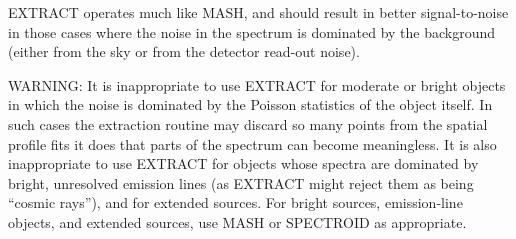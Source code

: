 EXTRACT operates much like MASH, and should result in better
signal-to-noise in those cases where the noise in the spectrum is dominated
by the background (either from the sky or from the detector read-out
noise).  

WARNING: It is inappropriate to use EXTRACT for moderate or bright objects
in which the noise is dominated by the Poisson statistics of the object
itself.  In such cases the extraction routine may discard so many points
from the spatial profile fits it does that parts of the spectrum can become
meaningless.  It is also inappropriate to use EXTRACT for objects whose
spectra are dominated by bright, unresolved emission lines (as EXTRACT
might reject them as being ``cosmic rays''), and for extended sources.  For
bright sources, emission-line objects, and extended sources, use MASH or
SPECTROID as appropriate.

